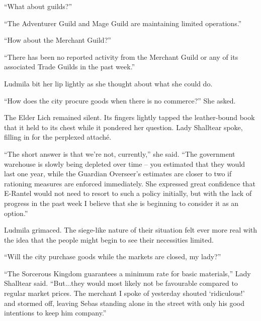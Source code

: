  

“What about guilds?”

 

“The Adventurer Guild and Mage Guild are maintaining limited operations.”

 

“How about the Merchant Guild?”

 

“There has been no reported activity from the Merchant Guild or any of its associated Trade Guilds in the past week.”

 

Ludmila bit her lip lightly as she thought about what she could do.

 

“How does the city procure goods when there is no commerce?” She asked.

 

The Elder Lich remained silent. Its fingers lightly tapped the leather-bound book that it held to its chest while it pondered her question. Lady Shalltear spoke, filling in for the perplexed attaché.

 

“The short answer is that we’re not, currently,” she said. “The government warehouse is slowly being depleted over time – you estimated that they would last one year, while the Guardian Overseer’s estimates are closer to two if rationing measures are enforced immediately. She expressed great confidence that E-Rantel would not need to resort to such a policy initially, but with the lack of progress in the past week I believe that she is beginning to consider it as an option.”

 

Ludmila grimaced. The siege-like nature of their situation felt ever more real with the idea that the people might begin to see their necessities limited.

 

“Will the city purchase goods while the markets are closed, my lady?”

 

“The Sorcerous Kingdom guarantees a minimum rate for basic materials,” Lady Shalltear said. “But...they would most likely not be favourable compared to regular market prices. The merchant I spoke of yesterday shouted ‘ridiculous!’ and stormed off, leaving Sebas standing alone in the street with only his good intentions to keep him company.”

 

